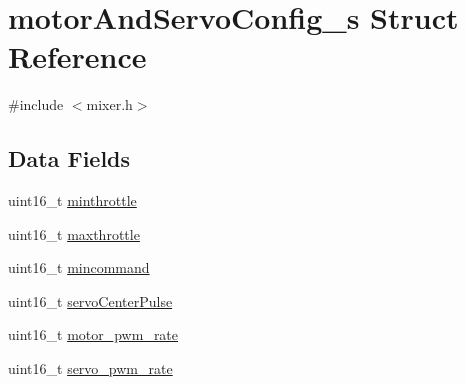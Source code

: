 \hypertarget{structmotorAndServoConfig__s}{\section{motor\+And\+Servo\+Config\+\_\+s Struct Reference}
\label{structmotorAndServoConfig__s}
}


{\ttfamily \#include $<$mixer.\+h$>$}

\subsection*{Data Fields}
\begin{DoxyCompactItemize}
\item 
uint16\+\_\+t \hyperlink{structmotorAndServoConfig__s_ad3bed82a4f0874363461552348ea2936}{minthrottle}
\item 
uint16\+\_\+t \hyperlink{structmotorAndServoConfig__s_a09f82a6a4090a44cfbb552cf6176f5d7}{maxthrottle}
\item 
uint16\+\_\+t \hyperlink{structmotorAndServoConfig__s_a20dbd179de76cfef03263cf26553f581}{mincommand}
\item 
uint16\+\_\+t \hyperlink{structmotorAndServoConfig__s_acd5fefdc80ca81f28d20ecd23f0222f6}{servo\+Center\+Pulse}
\item 
uint16\+\_\+t \hyperlink{structmotorAndServoConfig__s_ae3518998777866c6d2beba25be2c5a0b}{motor\+\_\+pwm\+\_\+rate}
\item 
uint16\+\_\+t \hyperlink{structmotorAndServoConfig__s_a7e2ee09b7c42bfa3da9d7658c03b77cf}{servo\+\_\+pwm\+\_\+rate}
\end{DoxyCompactItemize}


